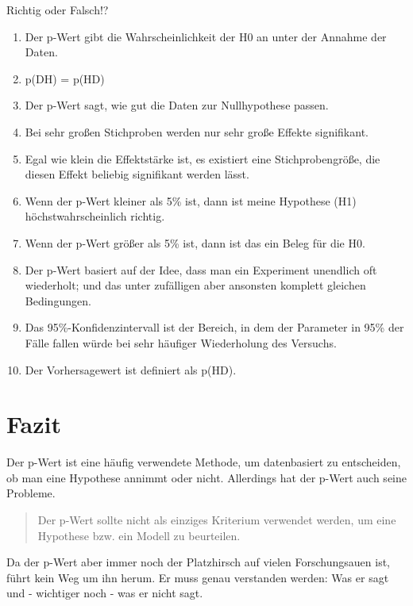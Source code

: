 \documentclass[12pt,ngerman,]{book}
\theoremstyle{definition}
\theoremstyle{definition}
\theoremstyle{remark}
\let\BeginKnitrBlock\begin \let\EndKnitrBlock\end
\begin{document}
\BeginKnitrBlock{rmdexercises}
Richtig oder Falsch!?

\begin{enumerate}
\def\labelenumi{\arabic{enumi}.}
\item
  Der p-Wert gibt die Wahrscheinlichkeit der H0 an unter der Annahme der
  Daten.
\item
  p(D\textbar{}H) = p(H\textbar{}D)
\item
  Der p-Wert sagt, wie gut die Daten zur Nullhypothese passen.
\item
  Bei sehr großen Stichproben werden nur sehr große Effekte signifikant.
\item
  Egal wie klein die Effektstärke ist, es existiert eine
  Stichprobengröße, die diesen Effekt beliebig signifikant werden lässt.
\item
  Wenn der p-Wert kleiner als 5\% ist, dann ist meine Hypothese (H1)
  höchstwahrscheinlich richtig.
\item
  Wenn der p-Wert größer als 5\% ist, dann ist das ein Beleg für die H0.
\item
  Der p-Wert basiert auf der Idee, dass man ein Experiment unendlich oft
  wiederholt; und das unter zufälligen aber ansonsten komplett gleichen
  Bedingungen.
\item
  Das 95\%-Konfidenzintervall ist der Bereich, in dem der Parameter in
  95\% der Fälle fallen würde bei sehr häufiger Wiederholung des
  Versuchs.
\item
  Der Vorhersagewert ist definiert als p(H\textbar{}D).
\end{enumerate}
\EndKnitrBlock{rmdexercises}

\section{Fazit}\label{fazit}

Der p-Wert ist eine häufig verwendete Methode, um datenbasiert zu
entscheiden, ob man eine Hypothese annimmt oder nicht. Allerdings hat
der p-Wert auch seine Probleme.

\begin{quote}
Der p-Wert sollte nicht als einziges Kriterium verwendet werden, um eine
Hypothese bzw. ein Modell zu beurteilen.
\end{quote}

Da der p-Wert aber immer noch der Platzhirsch auf vielen Forschungsauen
ist, führt kein Weg um ihn herum. Er muss genau verstanden werden: Was
er sagt und - wichtiger noch - was er nicht sagt.
\end{document}
